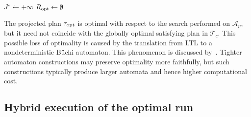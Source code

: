 \begin{algorithm}[t]
\caption{Optimal accepting run search, \texttt{OptRun}().}
\label{ch02:alg:optimal}
\DontPrintSemicolon
{}


$J^\star \leftarrow +\infty$\;
$R_{\textup{opt}} \leftarrow \emptyset$\;



\;
\end{algorithm}



\begin{remark}
\label{ch02:rem:optimality_loss}
The projected plan $\tau_{\textup{opt}}$ is optimal with respect to the search
performed on $\mathcal{A}_p$, but it need not coincide with the globally
optimal satisfying plan in $\mathcal{T}_c$. This possible loss of optimality is
caused by the translation from LTL to a nondeterministic B\"uchi automaton.
This phenomenon is discussed by~\citet{schuppan2005shortest}. Tighter automaton
constructions may preserve optimality more faithfully, but such constructions
typically produce larger automata and hence higher computational cost.
\end{remark}


\subsection{Hybrid execution of the optimal run}
\label{ch02:sec:hybrid}

